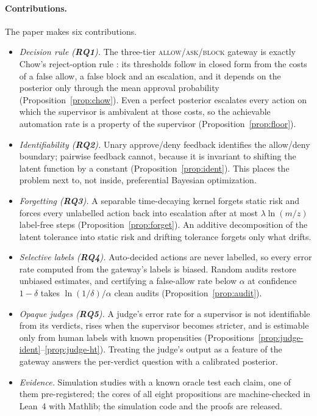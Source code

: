\documentclass[11pt]{article}
\newcommand{\RQ}[1]{\textbf{RQ#1}}
\begin{document}
\paragraph{Contributions.} The paper makes six contributions.
\begin{itemize}[leftmargin=1.2em, itemsep=2pt, topsep=3pt]
\item \emph{Decision rule (\RQ1).} The three-tier
  \textsc{allow}/\textsc{ask}/\textsc{block} gateway is exactly Chow's
  reject-option rule \citep{chow1970optimum}: its thresholds follow in closed
  form from the costs of a false allow, a false block and an escalation, and
  it depends on the posterior only through the mean approval probability
  (Proposition~\ref{prop:chow}). Even a perfect posterior escalates every
  action on which the supervisor is ambivalent at those costs, so the
  achievable automation rate is a property of the supervisor
  (Proposition~\ref{prop:floor}).
\item \emph{Identifiability (\RQ2).} Unary approve/deny feedback identifies
  the allow/deny boundary; pairwise feedback cannot, because it is invariant
  to shifting the latent function by a constant (Proposition~\ref{prop:ident}).
  This places the problem next to, not inside, preferential Bayesian
  optimization.
\item \emph{Forgetting (\RQ3).} A separable time-decaying kernel forgets
  static risk and forces every unlabelled action back into escalation after at
  most $\lambda \ln(m/z)$ label-free steps (Proposition~\ref{prop:forget}). An
  additive decomposition of the latent tolerance into static risk and
  drifting tolerance forgets only what drifts.
\item \emph{Selective labels (\RQ4).} Auto-decided actions are never labelled,
  so every error rate computed from the gateway's labels is biased. Random
  audits restore unbiased estimates, and certifying a false-allow rate below
  $\alpha$ at confidence $1-\delta$ takes $\ln(1/\delta)/\alpha$ clean audits
  (Proposition~\ref{prop:audit}).
\item \emph{Opaque judges (\RQ5).} A judge's error rate for a supervisor is
  not identifiable from its verdicts, rises when the supervisor becomes
  stricter, and is estimable only from human labels with known propensities
  (Propositions~\ref{prop:judge-ident}--\ref{prop:judge-ht}). Treating the
  judge's output as a feature of the gateway answers the per-verdict question
  with a calibrated posterior.
\item \emph{Evidence.} Simulation studies with a known oracle test each claim,
  one of them pre-registered; the cores of all eight propositions are
  machine-checked in Lean~4 with Mathlib; the simulation code and the
  proofs are released.
\end{itemize}
\end{document}
